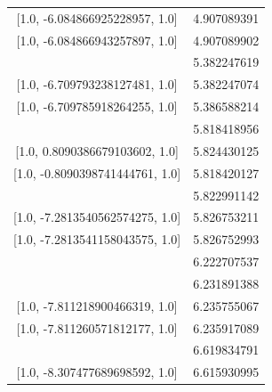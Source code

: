 \documentclass[reprint, aps, 12pt, floatfix]{revtex4-2}
\begin{document}
\begin{center}
\begin{tabular}{||c c||}
        [1.0, -6.084866925228957, 1.0]&4.907089391\\

        [1.0, -6.084866943257897, 1.0]&4.907089902\\
        \hline
        [1.0, -6.709793237392034, 1.0]&5.382247619\\

        [1.0, -6.709793238127481, 1.0]&5.382247074\\

        [1.0, -6.709785918264255, 1.0]&5.386588214\\
        \hline
        [1.0, 0.809039874164738, 1.0]&5.818418956\\

        [1.0, 0.8090386679103602, 1.0]&5.824430125\\

        [1.0, -0.8090398741444761, 1.0]&5.818420127\\
        \hline
        [1.0, -7.281369869968289, 1.0]&5.822991142\\

        [1.0, -7.2813540562574275, 1.0]&5.826753211\\

        [1.0, -7.2813541158043575, 1.0]&5.826752993\\
        \hline
        [1.0, -0.2519763555275555, 1.0]&6.222707537\\
        \hline
        [1.0, 7.81127097891731, 1.0]&6.231891388\\

        [1.0, -7.811218900466319, 1.0]&6.235755067\\

        [1.0, -7.811260571812177, 1.0]&6.235917089\\
        \hline
        [1.0, -8.307465564796429, 1.0]&6.619834791\\

        [1.0, -8.307477689698592, 1.0]&6.615930995\\
        \hline
    \end{tabular}
\end{center}
\end{document}
